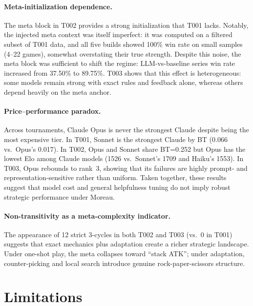 \documentclass[11pt]{article}
\newcommand{\tOne}{T001}
\newcommand{\tTwo}{T002}
\newcommand{\tThree}{T003}
\begin{document}
\paragraph{Meta-initialization dependence.}
The meta block in \tTwo{} provides a strong initialization that \tOne{} lacks.
Notably, the injected meta context was itself imperfect: it was computed on a filtered subset of \tOne{} data, and all five builds showed 100\% win rate on small samples (4--22 games), somewhat overstating their true strength.
Despite this noise, the meta block was sufficient to shift the regime: LLM-vs-baseline series win rate increased from 37.50\% to 89.75\%.
\tThree{} shows that this effect is heterogeneous: some models remain strong with exact rules and feedback alone, whereas others depend heavily on the meta anchor.

\paragraph{Price--performance paradox.}
Across tournaments, Claude Opus is never the strongest Claude despite being the most expensive tier.
In \tOne, Sonnet is the strongest Claude by BT (0.066 vs.\ Opus's 0.017).
In \tTwo, Opus and Sonnet share BT=0.252 but Opus has the lowest Elo among Claude models (1526 vs.\ Sonnet's 1709 and Haiku's 1553).
In \tThree, Opus rebounds to rank~3, showing that its failures are highly prompt- and representation-sensitive rather than uniform.
Taken together, these results suggest that model cost and general helpfulness tuning do not imply robust strategic performance under Moreau.

\paragraph{Non-transitivity as a meta-complexity indicator.}
The appearance of 12 strict 3-cycles in both \tTwo{} and \tThree{} (vs.\ 0 in \tOne) suggests that exact mechanics plus adaptation create a richer strategic landscape.
Under one-shot play, the meta collapses toward ``stack ATK''; under adaptation, counter-picking and local search introduce genuine rock-paper-scissors structure.

\section{Limitations}
\label{sec:limits}
\end{document}
